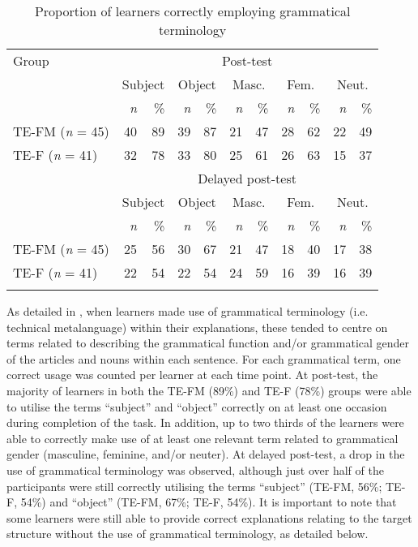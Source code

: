 \documentclass[output=paper]{langscibook}
\begin{document}
\begin{table}[H]
\begin{tabular}{lrrrrrrrrrr}
\lsptoprule
Group & \multicolumn{10}{c}{Post-test}\\\cmidrule(lr){2-11}
& \multicolumn{2}{c}{Subject} & \multicolumn{2}{c}{Object} & \multicolumn{2}{c}{Masc.} & \multicolumn{2}{c}{Fem.} & \multicolumn{2}{c}{Neut.}\\
\cmidrule(lr){2-3}\cmidrule(lr){4-5}\cmidrule(lr){6-7}\cmidrule(lr){8-9}\cmidrule(lr){10-11}
& \textit{n} & \% & \textit{n} & \% & \textit{n} & \% & \textit{n} & \% & \textit{n} & \%\\
\midrule
TE-FM (\textit{n} = 45) & 40 & 89 & 39 & 87 & 21 & 47 & 28 & 62 & 22 & 49\\
TE-F (\textit{n} = 41) & 32 & 78 & 33 & 80 & 25 & 61 & 26 & 63 & 15 & 37\\
\midrule
 & \multicolumn{10}{c}{Delayed post-test}\\\cmidrule(lr){2-11}
& \multicolumn{2}{c}{Subject} & \multicolumn{2}{c}{Object} & \multicolumn{2}{c}{Masc.} & \multicolumn{2}{c}{Fem.} & \multicolumn{2}{c}{Neut.}\\
\cmidrule(lr){2-3}\cmidrule(lr){4-5}\cmidrule(lr){6-7}\cmidrule(lr){8-9}\cmidrule(lr){10-11}
& \textit{n} & \% & \textit{n} & \% & \textit{n} & \% & \textit{n} & \% & \textit{n} & \%\\
\midrule
TE-FM (\textit{n} = 45) & 25 & 56 & 30 & 67 & 21 & 47 & 18 & 40 & 17 & 38\\
TE-F (\textit{n} = 41) & 22 & 54 & 22 & 54 & 24 & 59 & 16 & 39 & 16 & 39\\
\lspbottomrule
\end{tabular}
\caption{Proportion of learners correctly employing grammatical terminology\label{tab:kasprowicz:3}}
\end{table}
\vfill\pagebreak

As detailed in , when learners made use of grammatical terminology (i.e. technical metalanguage) within their explanations, these tended to centre on terms related to describing the grammatical function and/or grammatical gender of the articles and nouns within each sentence. For each grammatical term, one correct usage was counted per learner at each time point. At post-test, the majority of learners in both the TE-FM (89\%) and TE-F (78\%) groups were able to utilise the terms ``subject'' and ``object'' correctly on at least one occasion during completion of the task. In addition, up to two thirds of the learners were able to correctly make use of at least one relevant term related to grammatical gender (masculine, feminine, and/or neuter). At delayed post-test, a drop in the use of grammatical terminology was observed, although just over half of the participants were still correctly utilising the terms ``subject'' (TE-FM, 56\%; TE-F, 54\%) and ``object'' (TE-FM, 67\%; TE-F, 54\%). It is important to note that some learners were still able to provide correct explanations relating to the target structure without the use of grammatical terminology, as detailed below.
\end{document}
